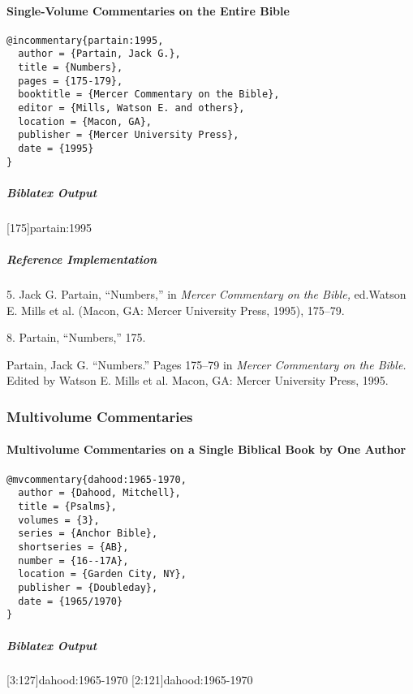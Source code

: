 \documentclass[a4paper]{article}
\newenvironment{biboutput}{%
  \subparagraph{Biblatex Output}
}{\color{black}}
\newenvironment{refimp}{%
  \subparagraph{Reference Implementation}
  \color{reference-colour}
  \rm
}{\par\color{black}}
\begin{document}
\paragraph{Single-Volume Commentaries on the Entire Bible}

\begin{lstlisting}
@incommentary{partain:1995,
  author = {Partain, Jack G.},
  title = {Numbers},
  pages = {175-179},
  booktitle = {Mercer Commentary on the Bible},
  editor = {Mills, Watson E. and others},
  location = {Macon, GA},
  publisher = {Mercer University Press},
  date = {1995}
}
\end{lstlisting}

\begin{biboutput}
  [175]{partain:1995}
\end{biboutput}

\begin{refimp}
  \hspace*{\bibindent}5. Jack G. Partain, “Numbers,” in \emph{Mercer
  Commentary on the Bible,} ed.\@ Watson E. Mills et al. (Macon, GA: Mercer
  University Press, 1995), 175–79.

  \hspace*{\bibindent}8. Partain, “Numbers,” 175.

  \hangindent\bibindent Partain, Jack G. “Numbers.” Pages 175–79 in
  \emph{Mercer Commentary on the Bible.} Edited by Watson E. Mills et al.
  Macon, GA: Mercer University Press, 1995.
\end{refimp}

\subsubsection{Multivolume Commentaries}

\paragraph{Multivolume Commentaries on a Single Biblical Book by One Author}

\begin{lstlisting}
@mvcommentary{dahood:1965-1970,
  author = {Dahood, Mitchell},
  title = {Psalms},
  volumes = {3},
  series = {Anchor Bible},
  shortseries = {AB},
  number = {16--17A},
  location = {Garden City, NY},
  publisher = {Doubleday},
  date = {1965/1970}
}
\end{lstlisting}

\begin{biboutput}
  [3:127]{dahood:1965-1970}
  [2:121]{dahood:1965-1970}
\end{biboutput}
\end{document}
